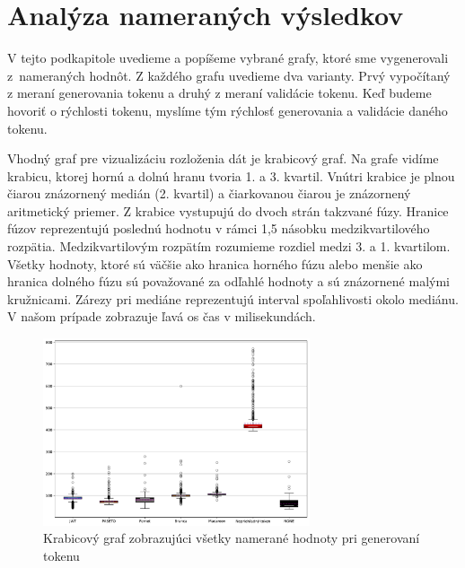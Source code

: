 \section{Analýza nameraných výsledkov}
\label{sec:vyhodnotenie}

V tejto podkapitole uvedieme a popíšeme vybrané grafy, ktoré sme vygenerovali z~nameraných hodnôt. Z každého grafu uvedieme dva varianty. Prvý vypočítaný z meraní generovania tokenu a druhý z meraní validácie tokenu. Keď budeme hovoriť o rýchlosti tokenu, myslíme tým rýchlosť generovania a validácie daného tokenu.

Vhodný graf pre vizualizáciu rozloženia dát je krabicový graf. Na grafe vidíme krabicu, ktorej hornú a dolnú hranu tvoria 1. a 3. kvartil. Vnútri krabice je plnou čiarou znázornený medián (2. kvartil) a čiarkovanou čiarou je znázornený aritmetický priemer. Z krabice vystupujú do dvoch strán takzvané fúzy. Hranice fúzov reprezentujú poslednú hodnotu v rámci 1,5 násobku medzikvartilového rozpätia. Medzikvartilovým rozpätím rozumieme rozdiel medzi 3. a 1. kvartilom. Všetky hodnoty, ktoré sú väčšie ako hranica horného fúzu alebo menšie ako hranica dolného fúzu sú považované za odľahlé hodnoty a sú znázornené malými kružnicami. Zárezy pri mediáne reprezentujú interval spoľahlivosti okolo mediánu. V našom prípade zobrazuje ľavá os čas v milisekundách.

\begin{figure}[H]
  \centerline{\includegraphics[width=0.7\textwidth]{images/signin_boxplot_allW}}
  \caption[Krabicový graf -- generovanie, všetky hodnoty]{Krabicový graf zobrazujúci všetky namerané hodnoty pri generovaní tokenu}
  \label{fig:signin_boxplot_allW}
\end{figure}

